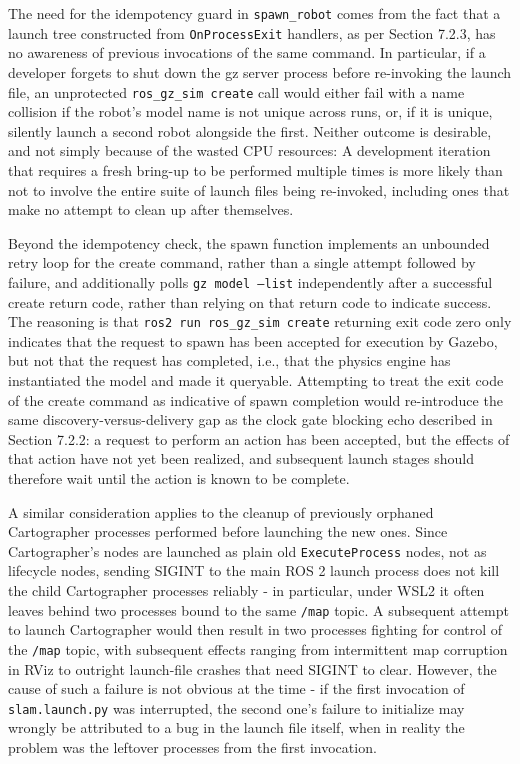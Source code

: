 The need for the idempotency guard in \texttt{spawn\_robot} comes from the fact that a launch tree constructed from \texttt{OnProcessExit} handlers, as per Section 7.2.3, has no awareness of previous invocations of the same command. In particular, if a developer forgets to shut down the gz server process before re-invoking the launch file, an unprotected \texttt{ros\_gz\_sim create} call would either fail with a name collision if the robot's model name is not unique across runs, or, if it is unique, silently launch a second robot alongside the first. Neither outcome is desirable, and not simply because of the wasted CPU resources: A development iteration that requires a fresh bring-up to be performed multiple times is more likely than not to involve the entire suite of launch files being re-invoked, including ones that make no attempt to clean up after themselves.

Beyond the idempotency check, the spawn function implements an unbounded retry loop for the create command, rather than a single attempt followed by failure, and additionally polls \texttt{gz model --list} independently after a successful create return code, rather than relying on that return code to indicate success. The reasoning is that \texttt{ros2 run ros\_gz\_sim create} returning exit code zero only indicates that the request to spawn has been accepted for execution by Gazebo, but not that the request has completed, i.e., that the physics engine has instantiated the model and made it queryable. Attempting to treat the exit code of the create command as indicative of spawn completion would re-introduce the same discovery-versus-delivery gap as the clock gate blocking echo described in Section 7.2.2: a request to perform an action has been accepted, but the effects of that action have not yet been realized, and subsequent launch stages should therefore wait until the action is known to be complete.

A similar consideration applies to the cleanup of previously orphaned Cartographer processes performed before launching the new ones. Since Cartographer's nodes are launched as plain old \texttt{ExecuteProcess} nodes, not as lifecycle nodes, sending SIGINT to the main ROS 2 launch process does not kill the child Cartographer processes reliably - in particular, under WSL2 it often leaves behind two processes bound to the same \texttt{/map} topic. A subsequent attempt to launch Cartographer would then result in two processes fighting for control of the \texttt{/map} topic, with subsequent effects ranging from intermittent map corruption in RViz to outright launch-file crashes that need SIGINT to clear. However, the cause of such a failure is not obvious at the time - if the first invocation of \texttt{slam.launch.py} was interrupted, the second one's failure to initialize may wrongly be attributed to a bug in the launch file itself, when in reality the problem was the leftover processes from the first invocation.

